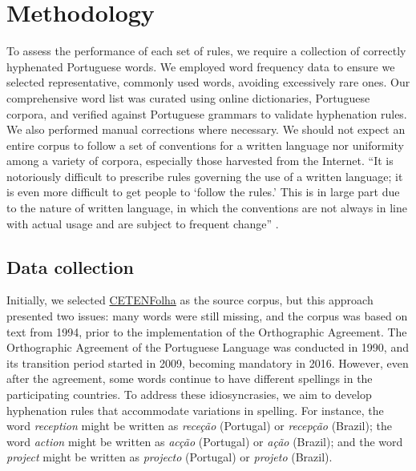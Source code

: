 \documentclass{article}
\begin{document}


\section{Methodology}\label{sec-methodology}

To assess the performance of each set of rules, we require a collection of
correctly hyphenated Portuguese words. We employed word frequency data to
ensure we selected representative, commonly used words, avoiding excessively
rare ones. Our comprehensive word list was curated using online dictionaries,
Portuguese corpora, and verified against Portuguese grammars to validate
hyphenation rules. We also performed manual corrections where necessary.
We should not expect an entire corpus to follow a set of conventions for a written 
language nor uniformity among a variety of corpora, especially those harvested from the Internet.
``It is notoriously difficult to prescribe rules governing the use of a written language; it is even more difficult
to get people to `follow the rules.' This is in large part due to the nature of written language, in which
the conventions are not always in line with actual usage and are subject to frequent change'' \parencite[p.~14]{palmer2010}.


\subsection{Data collection}\label{sec-data-coll}

Initially, we selected
\href{https://www.linguateca.pt/cetenfolha/index_info.html}{CETENFolha}
as the source corpus, but this approach presented two issues: many
words were still missing, and the corpus was based on text from 1994, prior to
the implementation of the Orthographic Agreement. The Orthographic Agreement
of the Portuguese Language was conducted in 1990, and its transition period
started in 2009, becoming mandatory in 2016. However, even after the agreement,
some words continue to have different spellings in the participating countries.
To address these idiosyncrasies, we aim to develop hyphenation rules that
accommodate variations in spelling. For instance, the word \emph{reception}
might be written as \emph{receção} (Portugal) or \emph{recepção} (Brazil); the
word \emph{action} might be written as \emph{acção} (Portugal) or \emph{ação}
(Brazil); and the word \emph{project} might be written as \emph{projecto}
(Portugal) or \emph{projeto} (Brazil).
\end{document}
